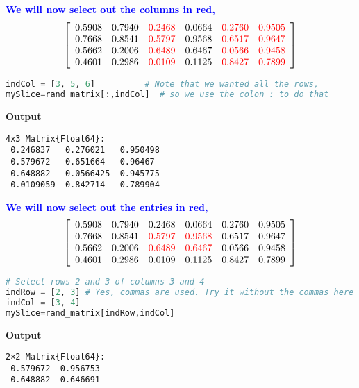 \textcolor{blue}{\bf We will now select out the columns in red,}
\begin{equation}
\left[
\begin{array}{cccccc}
0.5908 & 0.7940 & \color{red} 0.2468 & 0.0664 & \color{red} 0.2760 & \color{red} 0.9505 \\
0.7668 & 0.8541 &  \color{red} 0.5797 &  0.9568 & \color{red} 0.6517 & \color{red} 0.9647 \\
0.5662 & 0.2006 &  \color{red} 0.6489 &  0.6467 & \color{red} 0.0566 & \color{red} 0.9458 \\
0.4601 & 0.2986 & \color{red} 0.0109 & 0.1125 & \color{red} 0.8427 & \color{red} 0.7899 \\
\end{array}
\right]
\end{equation}



\begin{lstlisting}[language=Julia,style=mystyle]
indCol = [3, 5, 6]          # Note that we wanted all the rows, 
mySlice=rand_matrix[:,indCol]  # so we use the colon : to do that
\end{lstlisting}
\textbf{Output} 
\begin{verbatim}
4x3 Matrix{Float64}:
 0.246837   0.276021   0.950498
 0.579672   0.651664   0.96467
 0.648882   0.0566425  0.945775
 0.0109059  0.842714   0.789904
\end{verbatim}


\textcolor{blue}{\bf We will now select out the entries in red,}
\begin{equation}
\left[
\begin{array}{cccccc}
0.5908 & 0.7940 & 0.2468 & 0.0664 & 0.2760 & 0.9505 \\
0.7668 & 0.8541 & \color{red} 0.5797 & \color{red} 0.9568 & 0.6517 & 0.9647 \\
0.5662 & 0.2006 & \color{red} 0.6489 & \color{red} 0.6467 & 0.0566 & 0.9458 \\
0.4601 & 0.2986 & 0.0109 & 0.1125 & 0.8427 & 0.7899 \\
\end{array}
\right]
\end{equation}


\begin{lstlisting}[language=Julia,style=mystyle]
# Select rows 2 and 3 of columns 3 and 4
indRow = [2, 3] # Yes, commas are used. Try it without the commas here
indCol = [3, 4]
mySlice=rand_matrix[indRow,indCol]
\end{lstlisting}
\textbf{Output} 
\begin{verbatim}
2×2 Matrix{Float64}:
 0.579672  0.956753
 0.648882  0.646691
\end{verbatim}


